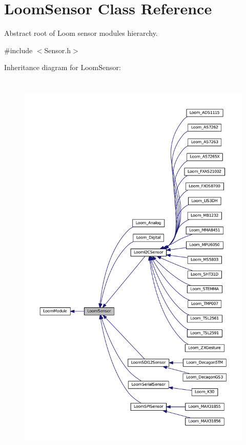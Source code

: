 \hypertarget{class_loom_sensor}{}\section{Loom\+Sensor Class Reference}
\label{class_loom_sensor}


Abstract root of Loom sensor modules hierarchy.  




{\ttfamily \#include $<$Sensor.\+h$>$}



Inheritance diagram for Loom\+Sensor\+:\nopagebreak
\begin{figure}[H]
\begin{center}
\leavevmode
\includegraphics[height=550pt]{class_loom_sensor__inherit__graph}
\end{center}
\end{figure}

